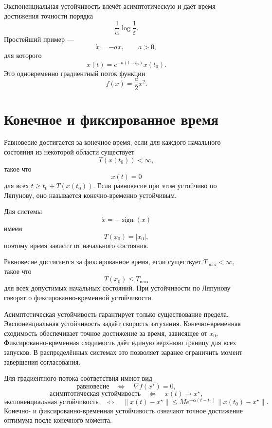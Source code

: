 Экспоненциальная устойчивость влечёт асимптотическую и даёт время
достижения точности порядка
\[
    \frac1\alpha\log\frac1\varepsilon.
\]
Простейший пример ---
\[
    \dot x=-ax,
    \qquad
    a>0,
\]
для которого
\[
    x(t)=e^{-a(t-t_0)}x(t_0).
\]
Это одновременно градиентный поток функции
\[
    f(x)=\frac a2x^2.
\]

\section{Конечное и фиксированное время}

\begin{definition}
Равновесие достигается за конечное время, если для каждого начального
состояния из некоторой области существует
\[
    T(x(t_0))<\infty,
\]
такое что
\[
    x(t)=0
\]
для всех \(t\ge t_0+T(x(t_0))\). Если равновесие при этом устойчиво
по Ляпунову, оно называется конечно-временно устойчивым.
\end{definition}

Для системы
\[
    \dot x=-\operatorname{sign}(x)
\]
имеем
\[
    T(x_0)=|x_0|,
\]
поэтому время зависит от начального состояния.

\begin{definition}
Равновесие достигается за фиксированное время, если существует
\(T_{\max}<\infty\), такое что
\[
    T(x_0)\le T_{\max}
\]
для всех допустимых начальных состояний. При устойчивости по Ляпунову
говорят о фиксированно-временной устойчивости.
\end{definition}

Асимптотическая устойчивость гарантирует только существование
предела. Экспоненциальная устойчивость задаёт скорость затухания.
Конечно-временная сходимость обеспечивает точное достижение за время,
зависящее от \(x_0\). Фиксированно-временная сходимость даёт единую
верхнюю границу для всех запусков. В распределённых системах это
позволяет заранее ограничить момент завершения согласования.

Для градиентного потока соответствия имеют вид
\[
    \text{равновесие}
    \quad\Longleftrightarrow\quad
    \nabla f(x^\star)=0,
\]
\[
    \text{асимптотическая устойчивость}
    \quad\Longleftrightarrow\quad
    x(t)\to x^\star,
\]
\[
    \text{экспоненциальная устойчивость}
    \quad\Longleftrightarrow\quad
    \lVert x(t)-x^\star\rVert
    \le
    M e^{-\alpha(t-t_0)}
    \lVert x(t_0)-x^\star\rVert.
\]
Конечно- и фиксированно-временная устойчивость означают точное
достижение оптимума после конечного момента.

